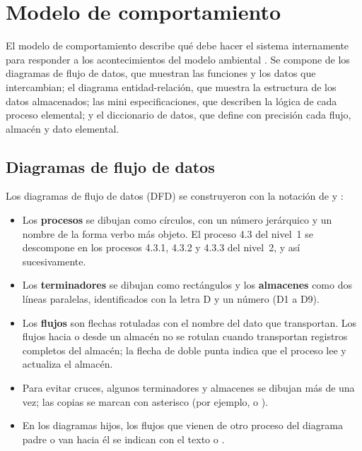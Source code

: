 \chapter{Modelo de comportamiento}
\label{cap:comportamiento}

El modelo de comportamiento describe qué debe hacer el sistema internamente para responder a
los acontecimientos del modelo ambiental \parencite{yourdon1989}. Se compone de los diagramas
de flujo de datos, que muestran las funciones y los datos que intercambian; el diagrama
entidad-relación, que muestra la estructura de los datos almacenados; las mini
especificaciones, que describen la lógica de cada proceso elemental; y el diccionario de
datos, que define con precisión cada flujo, almacén y dato elemental.

\section{Diagramas de flujo de datos}
\label{sec:dfd}

Los diagramas de flujo de datos (DFD) se construyeron con la notación de
\textcite{yourdon1989} y \textcite{demarco1979}:

\begin{itemize}
    \item Los \textbf{procesos} se dibujan como círculos, con un número jerárquico y un nombre
    de la forma verbo más objeto. El proceso 4.3 del nivel~1 se descompone en los procesos
    4.3.1, 4.3.2 y 4.3.3 del nivel~2, y así sucesivamente.
    \item Los \textbf{terminadores} se dibujan como rectángulos y los \textbf{almacenes} como
    dos líneas paralelas, identificados con la letra D y un número (D1 a D9).
    \item Los \textbf{flujos} son flechas rotuladas con el nombre del dato que transportan.
    Los flujos hacia o desde un almacén no se rotulan cuando transportan registros completos
    del almacén; la flecha de doble punta indica que el proceso lee y actualiza el almacén.
    \item Para evitar cruces, algunos terminadores y almacenes se dibujan más de una vez; las
    copias se marcan con asterisco (por ejemplo,  o ).
    \item En los diagramas hijos, los flujos que vienen de otro proceso del diagrama padre o
    van hacia él se indican con el texto  o .
\end{itemize}

